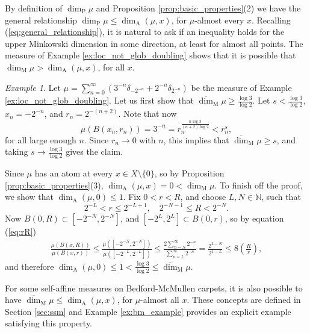 \documentclass{PRM}
\newcommand{\field}[1]{\mathbb{#1}}
\newcommand{\N}{\field{N}}
\newcommand{\updim}{\overline{\dim}}
\newcommand{\adim}{\dim_{\mathrm{A}}}
\theoremstyle{plain}
\theoremstyle{definition}
\theoremstyle{remark}
\newtheorem{example}[thm]{Example}
\begin{document}
By definition of $\dim_{\mathrm{P}}\mu$ and Proposition \ref{prop:basic_properties}(2) we have the general relationship $\dim_{\mathrm{P}}\mu\leq\dim_{\mathrm{A}}(\mu,x)$, for $\mu$-almost every $x$. Recalling (\ref{eq:general_relationship}), it is natural to ask if an inequality holds for the upper Minkowski dimension in some direction, at least for almost all points. The measure of Example \ref{ex:loc_not_glob_doubling} shows that it is possible that $\updim_{\mathrm{M}}\mu >\adim(\mu,x)$, for all $x$.

\begin{example}
    Let $\mu=\sum_{n=0}^{\infty}(3^{-n}\delta_{-2^{-n}}+2^{-n}\delta_{2^{-n}})$ be the measure of Example \ref{ex:loc_not_glob_doubling}. Let us first show that $\updim_{\mathrm{M}}\mu\geq \frac{\log 3}{\log 2}$. Let $s<\frac{\log 3}{\log 2}$, $x_n=-2^{-n}$, and $r_n=2^{-(n+2)}$. Note that now
    \begin{equation*}
        \mu(B(x_n,r_n))=3^{-n}=r_n^{\frac{n\log 3}{(n+2)\log 2}}< r_n^{s},
    \end{equation*}
    for all large enough $n$. Since $r_n\to 0$ with $n$, this implies that $\updim_{\mathrm{M}}\mu\geq s$, and taking $s\to\frac{\log 3}{\log 2}$ gives the claim.
    
   Since $\mu$ has an atom at every $x\in X\setminus\{0\}$, so by Proposition \ref{prop:basic_properties}(3), $\dim_{\mathrm{A}}(\mu,x)=0<\updim_{\mathrm{M}}\mu$. To finish off the proof, we show that $\dim_{\mathrm{A}}(\mu,0)\leq1$. Fix $0<r<R$, and choose $L,N\in \N$, such that
    \begin{equation}\label{eq:rR}
        2^{-L}< r \leq 2^{-L+1},\quad2^{-N-1}\leq R < 2^{-N}.
    \end{equation}
    Now $B(0,R)\subset [-2^{-N},2^{-N}]$, and $[-2^{L},2^{L}]\subset B(0,r)$, so by equation (\ref{eq:rR})
    \begin{align*}
        \frac{\mu(B(x,R))}{\mu(B(x,r))}\leq \frac{\mu([-2^{-N},2^{-N}])}{\mu([-2^{-L},2^{-L}])}\leq\frac{2\sum_{n=N}^{\infty}2^{-n}}{\sum_{n=L}^{\infty}2^{-n}}=\frac{2^{2-N}}{2^{1-L}}\leq 8\left(\frac{R}{r}\right),
    \end{align*}
    and therefore $\dim_{\mathrm{A}}(\mu,0)\leq1<\frac{\log3}{\log 2}\leq \updim_{\mathrm{M}}\mu$.
\end{example}
For some self-affine measures on Bedford-McMullen carpets, it is also possible to have $\updim_{\mathrm{M}}\mu \leq\adim(\mu,x)$, for $\mu$-almost all $x$. These concepts are defined in Section \ref{sec:ssm} and Example \ref{ex:bm_example} provides an explicit example satisfying this property.
\end{document}

